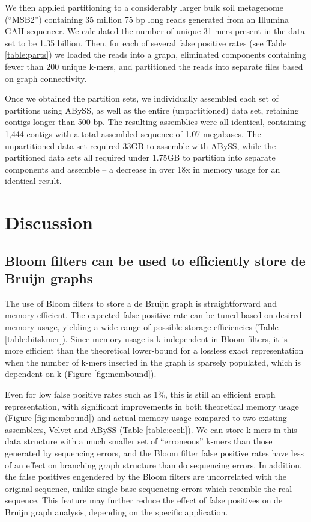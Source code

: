 \documentclass{pnastwo}
\begin{document}
\begin{article}
We then applied partitioning to a considerably larger bulk soil
metagenome (``MSB2'') containing 35 million 75 bp long reads generated
from an Illumina GAII sequencer.  We calculated the number of unique
31-mers present in the data set to be 1.35 billion. Then, for each of
several false positive rates (see Table \ref{table:parts}) we loaded
the reads into a graph, eliminated components containing fewer than
200 unique k-mers, and partitioned the reads into separate files based
on graph connectivity.

Once we obtained the partition sets, we individually assembled each
set of partitions using ABySS, as well as the entire (unpartitioned)
data set, retaining contigs longer than 500 bp.  The resulting
assemblies were all identical, containing 1,444 contigs with a total
assembled sequence of 1.07 megabases.  The unpartitioned data set
required 33GB to assemble with ABySS, while the partitioned data sets
all required under 1.75GB to partition into separate components and
assemble -- a decrease in over 18x in memory usage for an identical
result.


\section{Discussion}


\subsection{Bloom filters can be used to efficiently store de Bruijn graphs}

The use of Bloom filters to store a de Bruijn graph is straightforward
and memory efficient.  The expected false positive rate can be tuned
based on desired memory usage, yielding a wide range of possible
storage efficiencies (Table \ref{table:bitskmer}). Since memory usage
is k independent in Bloom filters, it is more efficient than the
theoretical lower-bound for a lossless exact representation when the
number of k-mers inserted in the graph is sparsely populated, which is
dependent on k (Figure \ref{fig:membound}).

Even for low false positive rates such as 1\%, this is still an
efficient graph representation, with significant improvements in both
theoretical memory usage (Figure \ref{fig:membound}) and actual memory 
usage compared
to two existing assemblers, Velvet and ABySS (Table
\ref{table:ecoli}).  We can store k-mers in this data structure with a
much smaller set of ``erroneous'' k-mers than those generated by
sequencing errors, and the Bloom filter false positive rates have less
of an effect on branching graph structure than do sequencing errors.
In addition, the false positives engendered by the Bloom filters are
uncorrelated with the original sequence, unlike single-base sequencing
errors which resemble the real sequence.  This feature may further
reduce the effect of false positives on de Bruijn graph analysis,
depending on the specific application.


\end{article}
\end{document}
